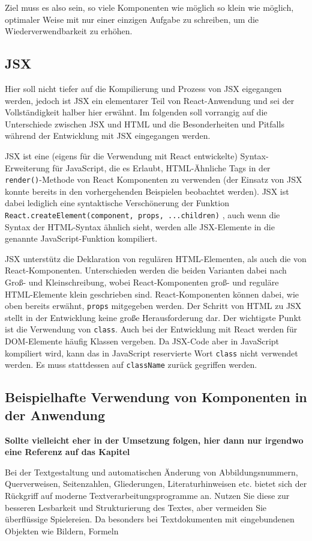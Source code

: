 Ziel muss es also sein, so viele Komponenten wie möglich so klein wie möglich, optimaler Weise mit nur einer einzigen Aufgabe zu schreiben, um die Wiederverwendbarkeit zu erhöhen.

\subsection{JSX}
Hier soll nicht tiefer auf die Kompilierung und Prozess von JSX eigegangen werden, jedoch ist JSX ein elementarer Teil von React-Anwendung und sei der Vollständigkeit halber hier erwähnt. Im folgenden soll vorrangig auf die Unterschiede zwischen JSX und HTML und die Besonderheiten und Pitfalls während der Entwicklung mit JSX eingegangen werden.

JSX ist eine (eigens für die Verwendung mit React entwickelte) Syntax-Erweiterung für JavaScript, die es Erlaubt, HTML-Ähnliche Tags in der \verb|render()|-Methode von React Komponenten zu verwenden (der Einsatz von JSX konnte bereits in den vorhergehenden Beispielen beobachtet werden).
JSX ist dabei lediglich eine syntaktische Verschönerung der Funktion \verb|React.createElement(component, props, ...children)| \cite{ReactJSX}, auch wenn die Syntax der HTML-Syntax ähnlich sieht, werden alle JSX-Elemente in die genannte JavaScript-Funktion kompiliert.

JSX unterstütz die Deklaration von regulären HTML-Elementen, als auch die von React-Komponenten. Unterschieden werden die beiden Varianten dabei nach Groß- und Kleinschreibung, wobei React-Komponenten groß- und reguläre HTML-Elemente klein geschrieben sind.
React-Komponenten können dabei, wie oben bereits erwähnt, \verb|props| mitgegeben werden.
Der Schritt von HTML zu JSX stellt in der Entwicklung keine große Herausforderung dar.
Der wichtigste Punkt ist die Verwendung von \verb|class|. Auch bei der Entwicklung mit React werden für DOM-Elemente häufig Klassen vergeben. Da JSX-Code aber in JavaScript kompiliert wird, kann das in JavaScript reservierte Wort \verb|class| nicht verwendet werden. Es muss stattdessen auf \verb|className| zurück gegriffen werden. 

\subsection{Beispielhafte Verwendung von Komponenten in der Anwendung}
\textbf{Sollte vielleicht eher in der Umsetzung folgen, hier dann nur irgendwo eine Referenz auf das Kapitel}

Bei der Textgestaltung und automatischen Änderung von Abbildungsnummern, Querverweisen,
Seitenzahlen, Gliederungen, Literaturhinweisen etc. bietet sich der Rückgriff
auf moderne Textverarbeitungsprogramme an. Nutzen Sie diese zur besseren Lesbarkeit
und Strukturierung des Textes, aber vermeiden Sie überflüssige Spielereien. Da
besonders bei Textdokumenten mit eingebundenen Objekten wie Bildern, Formeln


